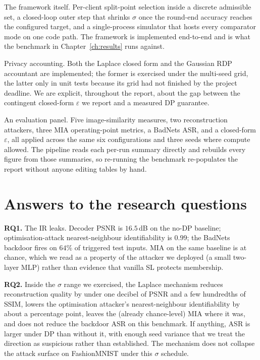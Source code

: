 \documentclass[11pt,a4paper,oneside]{report}
\begin{document}
The framework itself. Per-client split-point selection inside a
discrete admissible set, a closed-loop outer step that shrinks
$\sigma$ once the round-end accuracy reaches the configured target,
and a single-process simulator that hosts every comparator mode on
one code path. The framework is implemented end-to-end and is what
the benchmark in Chapter~\ref{ch:results} runs against.

Privacy accounting. Both the Laplace closed form and the Gaussian
RDP accountant are implemented; the former is exercised under the
multi-seed grid, the latter only in unit tests because its grid had
not finished by the project deadline. We are explicit, throughout
the report, about the gap between the contingent closed-form
$\varepsilon$ we report and a measured DP guarantee.

An evaluation panel. Five image-similarity measures, two
reconstruction attackers, three MIA operating-point metrics, a
BadNets ASR, and a closed-form $\varepsilon$, all applied across
the same six configurations and three seeds where compute allowed.
The pipeline reads each per-run summary directly and rebuilds every
figure from those summaries, so re-running the benchmark
re-populates the report without anyone editing tables by hand.

\section{Answers to the research questions}

\textbf{RQ1.} The IR leaks. Decoder PSNR is $16.5$\,dB on the no-DP
baseline; optimisation-attack nearest-neighbour identifiability is
$0.99$; the BadNets backdoor fires on $64\%$ of triggered test
inputs. MIA on the same baseline is at chance, which we read as a
property of the attacker we deployed (a small two-layer MLP) rather
than evidence that vanilla SL protects membership.

\textbf{RQ2.} Inside the $\sigma$ range we exercised, the Laplace
mechanism reduces reconstruction quality by under one decibel of
PSNR and a few hundredths of SSIM, lowers the optimisation attacker's
nearest-neighbour identifiability by about a percentage point,
leaves the (already chance-level) MIA where it was, and does not
reduce the backdoor ASR on this benchmark. If anything, ASR is
larger under DP than without it, with enough seed variance that we
treat the direction as suspicious rather than established. The
mechanism does not collapse the attack surface on FashionMNIST under
this $\sigma$ schedule.
\end{document}
